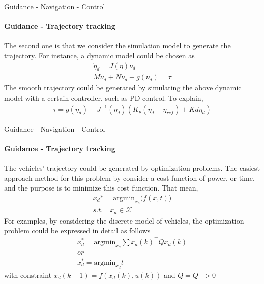 
\begin{frame}{Guidance - Navigation - Control}
	\framesubtitle{Guidance - Trajectory tracking}
	The second one is that we consider the simulation model to generate the trajectory. For instance, a dynamic model could be chosen as
	\begin{align}
		\dot{\eta}_d = J(\eta)\nu_d \\
		M\dot{\nu}_d + N\nu_d + g(\nu_d) = \tau
	\end{align}
	The smooth trajectory could be generated by simulating the above dynamic model with a certain controller, such as PD control. To explain,
	\begin{align}
		\tau = g(\eta_d) - J^{-1}(\eta_d)(K_p(\eta_d - \eta_{ref}) + Kd\dot{\eta}_d)
	\end{align}
\end{frame}




\begin{frame}{Guidance - Navigation - Control}
	\framesubtitle{Guidance - Trajectory tracking}
	The vehicles' trajectory could be generated by optimization problems. The easiest approach method for this problem by consider a cost function of power, or time, and the purpose is to minimize this cost function. That mean,
	\begin{align}
		x_d* = \text{argmin}_{x_d}\Big(f(x, t)\Big) \\
		s.t. \quad x_d \in \mathcal{X} 
	\end{align}
	For examples, by considering the discrete model of vehicles, the optimization problem could be expressed in detail as follows 
	\begin{align}
		x_d^* = \text{argmin}_{x_d}\sum x_d(k)^\top Q x_d(k)\\
		or\\
		x_d^* = \text{argmin}_{x_d} t
	\end{align}
	with constraint $x_d(k+1) = f(x_d(k), u(k))$ and $Q = Q^\top > 0$
\end{frame}



